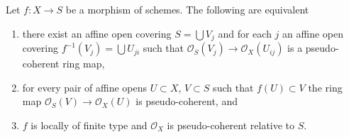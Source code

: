 \begin{lemma}
\label{lemma-pseudo-coherent}
Let $f : X \to S$ be a morphism of schemes. The following are equivalent
\begin{enumerate}
\item there exist an affine open covering $S = \bigcup V_j$ and for each $j$
an affine open covering $f^{-1}(V_j) = \bigcup U_{ji}$ such that
$\mathcal{O}_S(V_j) \to \mathcal{O}_X(U_{ij})$ is a pseudo-coherent
ring map,
\item for every pair of affine opens $U \subset X$, $V \subset S$
such that $f(U) \subset V$ the ring map
$\mathcal{O}_S(V) \to \mathcal{O}_X(U)$ is pseudo-coherent, and
\item $f$ is locally of finite type and $\mathcal{O}_X$
is pseudo-coherent relative to $S$.
\end{enumerate}
\end{lemma}
